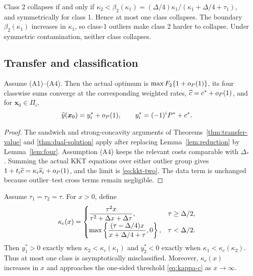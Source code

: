 \begin{corollary}\label{cor:breakdown-two}
Class 2 collapses if and only if $\kappa_2<\beta_2(\kappa_1)=(\Delta/4)\kappa_1/(\kappa_1+\Delta/4+\tau_1)$, and symmetrically for class 1. Hence at most one class collapses. The boundary $\beta_2(\kappa_1)$ increases in $\kappa_1$, so class-1 outliers make class 2 harder to collapse. Under symmetric contamination, neither class collapses.
\end{corollary}

\subsection{Transfer and classification}
\begin{theorem}\label{thm:transfer-two}
Assume (A1)--(A4). Then the actual optimum is $\max F_2\{1+o_{P}(1)\}$, its four classwise sums converge at the corresponding weighted rates, $\widehat c=c^*+o_{P}(1)$, and for $\boldsymbol x_0\in\Pi_i$,
\begin{equation}\label{eq:y-two}
\widehat y(\boldsymbol x_0)=y_i^*+o_{P}(1),
\qquad y_i^*=(-1)^iP^*+c^*.
\end{equation}
\end{theorem}
\begin{proof}
The sandwich and strong-concavity arguments of Theorems~\ref{thm:transfer-value} and \ref{thm:dual-solution} apply after replacing Lemma~\ref{lem:reduction} by Lemma~\ref{lem:four}. Assumption (A4) keeps the relevant costs comparable with $\Delta_*$. Summing the actual KKT equations over either outlier group gives $1+t_i\widehat c=\kappa_i\widehat s_i+o_{P}(1)$, and the limit is \eqref{eq:kkt-two}. The data term is unchanged because outlier--test cross terms remain negligible.
\end{proof}

\begin{corollary}\label{cor:misclass-two}
Assume $\tau_1=\tau_2=\tau$. For $x>0$, define
\begin{equation}\label{eq:kappacx}
\kappa_c(x)=
\begin{cases}
\displaystyle {\tau^2x\over\tau^2+\Delta x+\Delta\tau},&\tau\ge\Delta/2,\\[2mm]
\displaystyle \max\left\{{(\tau-\Delta/4)x\over x+\Delta/4+\tau},0\right\},&\tau<\Delta/2.
\end{cases}
\end{equation}
Then $y_1^*>0$ exactly when $\kappa_2<\kappa_c(\kappa_1)$ and $y_2^*<0$ exactly when $\kappa_1<\kappa_c(\kappa_2)$. Thus at most one class is asymptotically misclassified. Moreover, $\kappa_c(x)$ increases in $x$ and approaches the one-sided threshold \eqref{eq:kappa-c} as $x\to\infty$.
\end{corollary}

